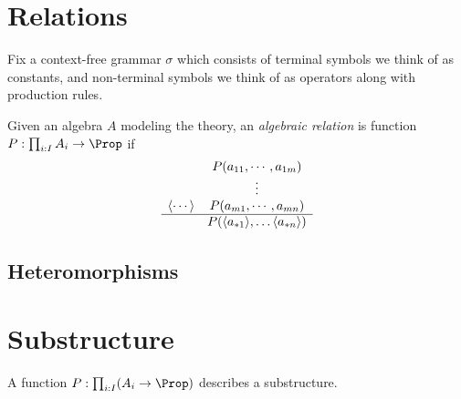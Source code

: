 
\section{Relations}
Fix a context-free grammar $\sigma$ which consists of terminal symbols 
we think of as constants, and non-terminal symbols we think of as operators
along with production rules.


Given an algebra $A$ modeling the theory,
an \emph{algebraic relation} is function $P:\prod_{i:I} A_i\to \Prop$ if 
\begin{align*}
    \begin{array}{cc}
        & P(a_{11}, \cdots, a_{1m})\\
        & \vdots \\
        \langle\cdots\rangle & P(a_{m1}, \cdots, a_{mn})\\
    \hline
       & P(\langle a_{*1}\rangle,\ldots \langle a_{*n}\rangle)
    \end{array}
\end{align*}

\subsection{Heteromorphisms}


\section{Substructure}
A function $P:\prod_{i:I}(A_i\to \Prop)$ describes a substructure.
\begin{center}
\end{center}